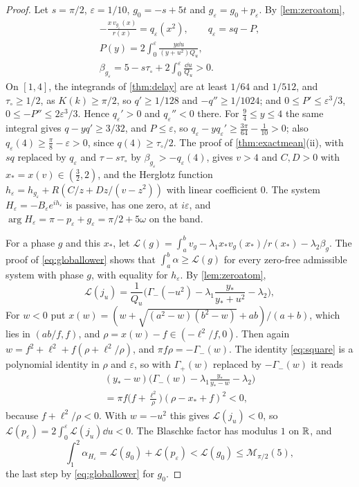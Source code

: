 \begin{proof}
Let $s=\pi/2$, $\varepsilon=1/10$, $g_0=-s+5t$ and
$g_\varepsilon=g_0+p_\varepsilon$. By \cref{lem:zeroatom},
\begin{gather*}
-\frac{x\,v_{g_\varepsilon}(x)}{r(x)}=q_\varepsilon(x^2),\qquad
q_\varepsilon=sq-P,\\
P(y)=2\int_0^\varepsilon\frac{y\dd u}{(y+u^2)Q_u},\\
\beta_{g_\varepsilon}=5-s\tau_\circ+2\int_0^\varepsilon\frac{\dd u}{Q_u}>0.
\end{gather*}
On $[1,4]$, the integrands of \cref{thm:delay} are at least $1/64$ and $1/512$,
and $\tau_\circ\ge1/2$, as $K(k)\ge\pi/2$, so $q'\ge1/128$ and $-q''\ge1/1024$; and $0\le P'\le
\varepsilon^3/3$, $0\le-P''\le2\varepsilon^3/3$. Hence $q_\varepsilon'>0$ and
$q_\varepsilon''<0$ there. For $\frac94\le y\le4$ the same integral gives
$q-yq'\ge3/32$, and $P\le\varepsilon$, so $q_\varepsilon-yq_\varepsilon'\ge
\frac{3\pi}{64}-\frac1{10}>0$; also $q_\varepsilon(4)\ge\frac\pi8-\varepsilon>0$, since
$q(4)\ge\tau_\circ/2$. The proof of \cref{thm:exactmean}(ii), with $sq$ replaced by
$q_\varepsilon$ and $\tau-s\tau_\circ$ by $\beta_{g_\varepsilon}>-q_\varepsilon(4)$, gives $v>4$ and $C,D>0$ with
$x_*=x(v)\in(\frac32,2)$, and the Herglotz function
$h_\varepsilon=h_{g_\varepsilon}+R(C/z+Dz/(v-z^2))$ with linear coefficient $0$.
The system $H_\varepsilon=-B_\varepsilon e^{ih_\varepsilon}$ is passive, has one zero, at
$i\varepsilon$, and $\arg H_\varepsilon=\pi-p_\varepsilon+g_\varepsilon=\pi/2+5\omega$ on the
band.

For a phase $g$ and this $x_*$, let
$\mathcal L(g)=\int_a^bv_g-\lambda_1x_*v_g(x_*)/r(x_*)-\lambda_2\beta_g$. The
proof of \eqref{eq:globallower} shows that $\int_a^b\alpha\ge\mathcal L(g)$
for every zero-free admissible system with phase $g$, with equality for
$h_\varepsilon$. By \cref{lem:zeroatom},
\[
\mathcal L(j_u)=\frac1{Q_u}\Big(\Gamma_-(-u^2)-\lambda_1\frac{y_*}{y_*+u^2}-\lambda_2\Big),
\]
For $w<0$ put $x(w)=(w+\sqrt{(a^2-w)(b^2-w)}+ab)/(a+b)$, which lies in
$(ab/f,f)$, and $\rho=x(w)-f\in(-\ell^2/f,0)$. Then again
$w=f^2+\ell^2+f(\rho+\ell^2/\rho)$, and $\pi f\rho=-\Gamma_-(w)$. The identity
\eqref{eq:square} is a polynomial identity in $\rho$ and $\varepsilon$, so with
$\Gamma_+(w)$ replaced by $-\Gamma_-(w)$ it reads
\begin{multline*}
(y_*-w)\Big(\Gamma_-(w)-\lambda_1\frac{y_*}{y_*-w}-\lambda_2\Big)\\
=\pi f\Big(f+\frac{\ell^2}\rho\Big)(\rho-x_*+f)^2<0,
\end{multline*}
because $f+\ell^2/\rho<0$. With $w=-u^2$ this gives $\mathcal L(j_u)<0$, so
$\mathcal L(p_\varepsilon)=2\int_0^\varepsilon\mathcal L(j_u)\dd u<0$. The Blaschke
factor has modulus $1$ on $\mathbb R$, and
\[
\int_1^2\alpha_{H_\varepsilon}=\mathcal L(g_0)+\mathcal L(p_\varepsilon)
<\mathcal L(g_0)\le\mathcal M_{\pi/2}(5),
\]
the last step by \eqref{eq:globallower} for $g_0$.
\end{proof}

